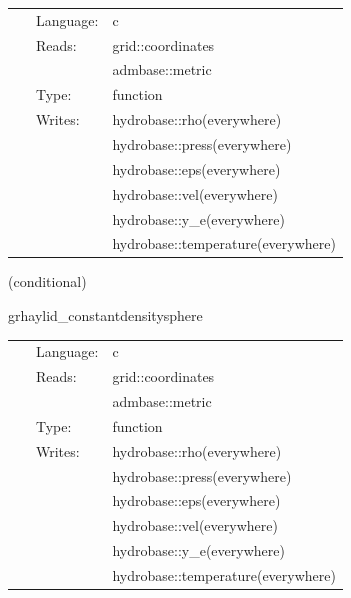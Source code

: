 \hspace{5mm}{\it set three-dimensional isotropic gas initial data } 


\hspace{5mm}

 \begin{tabular*}{160mm}{cll} 
~ & Language:  & c \\ 
~ & Reads:  & grid::coordinates \\ 
~& ~ &admbase::metric\\ 
~ & Type:  & function \\ 
~ & Writes:  & hydrobase::rho(everywhere) \\ 
~& ~ &hydrobase::press(everywhere)\\ 
~& ~ &hydrobase::eps(everywhere)\\ 
~& ~ &hydrobase::vel(everywhere)\\ 
~& ~ &hydrobase::y\_e(everywhere)\\ 
~& ~ &hydrobase::temperature(everywhere)\\ 
\end{tabular*} 


\vspace{5mm}

   (conditional) 

\hspace{5mm} grhaylid\_constantdensitysphere 

\hspace{5mm}{\it set three-dimensional constant-density sphere initial data } 


\hspace{5mm}

 \begin{tabular*}{160mm}{cll} 
~ & Language:  & c \\ 
~ & Reads:  & grid::coordinates \\ 
~& ~ &admbase::metric\\ 
~ & Type:  & function \\ 
~ & Writes:  & hydrobase::rho(everywhere) \\ 
~& ~ &hydrobase::press(everywhere)\\ 
~& ~ &hydrobase::eps(everywhere)\\ 
~& ~ &hydrobase::vel(everywhere)\\ 
~& ~ &hydrobase::y\_e(everywhere)\\ 
~& ~ &hydrobase::temperature(everywhere)\\ 
\end{tabular*} 


